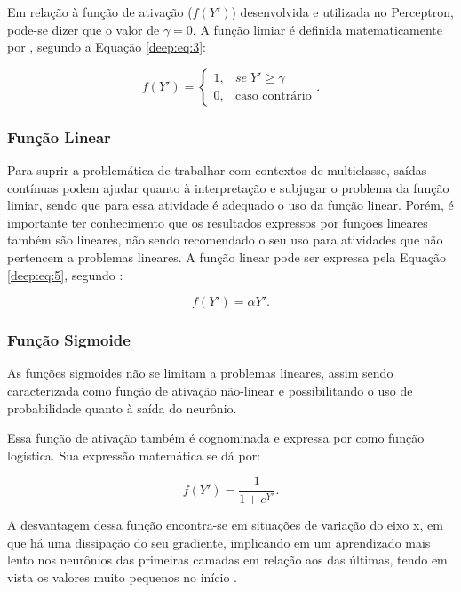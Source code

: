 Em relação à função de ativação ($f(Y')$) desenvolvida e utilizada no Perceptron, pode-se dizer que o valor de $\gamma = 0$. A função limiar é definida matematicamente por \cite{mcculloch1943logical}, segundo a Equação \ref{deep:eq:3}:

\begin{equation}
    \label{deep:eq:3}
    f(Y') = \begin{cases}
     1,& se \; Y' \geq \gamma \\ 
     0,& \text{caso contrário}
    \end{cases}.
\end{equation}


\subsubsection{Função Linear}
\label{deep:linear}
Para suprir a problemática de trabalhar com contextos de multiclasse, saídas contínuas podem ajudar quanto à interpretação e subjugar o problema da função limiar, sendo que para essa atividade é adequado o uso da função linear. Porém, é importante ter conhecimento que os resultados expressos por funções lineares também são lineares, não sendo recomendado o seu uso para atividades que não pertencem a problemas lineares. A função linear pode ser expressa pela Equação \ref{deep:eq:5}, segundo \cite{Rosenblatt1958}:

\begin{equation}
    \label{deep:eq:5}
    f(Y') = \alpha Y'.
\end{equation}


\subsubsection{Função Sigmoide}
\label{deep:sigmoide}
As funções sigmoides não se limitam a problemas lineares, assim sendo caracterizada como função de ativação não-linear e possibilitando o uso de probabilidade quanto à saída do neurônio.

Essa função de ativação também é cognominada e expressa por \cite{glorot2011deep} como função logística. Sua expressão matemática se dá por:

\begin{equation}
    \label{deep:eq:6}
    f(Y') = \frac{1}{1 + e^{Y'}}.
\end{equation}

A desvantagem dessa função encontra-se em situações de variação do eixo x, em que há uma dissipação do seu gradiente, implicando em um aprendizado mais lento nos neurônios das primeiras camadas em relação aos das últimas, tendo em vista os valores muito pequenos no início \citep{Goodfellow2016}.

